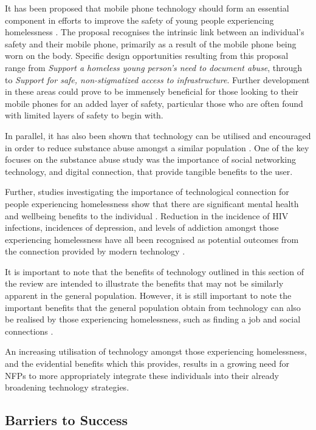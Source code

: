 It has been proposed that mobile phone technology should form an essential component in efforts to improve the safety of young people experiencing homelessness \cite{woelfer2011improving}. The proposal recognises the intrinsic link between an individual's safety and their mobile phone, primarily as a result of the mobile phone being worn on the body. Specific design opportunities resulting from this proposal range from \emph{Support a homeless young person’s need to document abuse}, through to \emph{Support for safe, non-stigmatized access to infrastructure}. Further development in these areas could prove to be immensely beneficial for those looking to their mobile phones for an added layer of safety, particular those who are often found with limited layers of safety to begin with.

In parallel, it has also been shown that technology can be utilised and encouraged in order to reduce substance abuse amongst a similar population \cite{rice2011social}. One of the key focuses on the substance abuse study was the importance of social networking technology, and digital connection, that provide tangible benefits to the user.

Further, studies investigating the importance of technological connection for people experiencing homelessness show that there are significant mental health and wellbeing benefits to the individual \cite{rice2011social} \cite{eyrich2010mobile} \cite{roberson2010survival}. Reduction in the incidence of HIV infections, incidences of depression, and levels of addiction amongst those experiencing homelessness have all been recognised as potential outcomes from the connection provided by modern technology \cite{sala2014benefits}.

It is important to note that the benefits of technology outlined in this section of the review are intended to illustrate the benefits that may not be similarly apparent in the general population. However, it is still important to note the important benefits that the general population obtain from technology can also be realised by those experiencing homelessness, such as finding a job and social connections \cite{le2008feature}.

An increasing utilisation of technology amongst those experiencing homelessness, and the evidential benefits which this provides, results in a growing need for NFPs to more appropriately integrate these individuals into their already broadening technology strategies.

\subsection{Barriers to Success}

